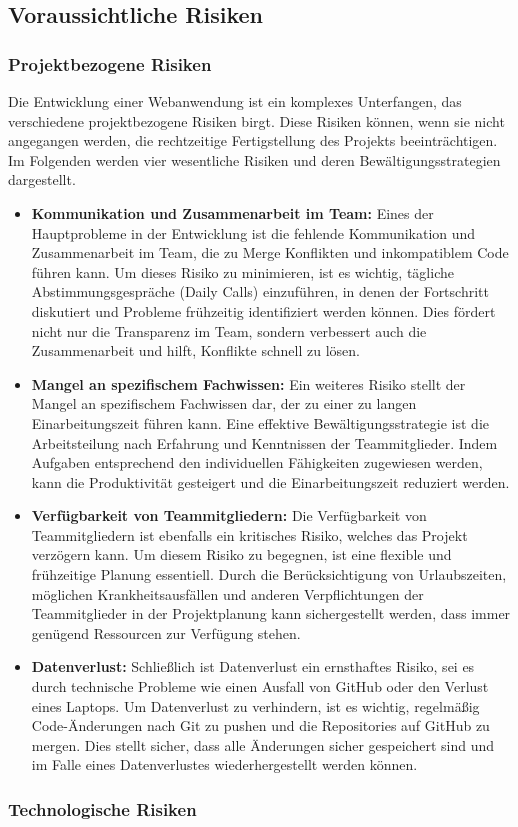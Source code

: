 \documentclass[../main.tex]{subfiles}
\begin{document}
\subsection{Voraussichtliche Risiken}

\subsubsection{Projektbezogene Risiken}

Die Entwicklung einer Webanwendung ist ein komplexes Unterfangen, das verschiedene projektbezogene Risiken birgt. Diese Risiken 
können, wenn sie nicht angegangen werden, die rechtzeitige Fertigstellung des Projekts beeinträchtigen. Im Folgenden werden vier 
wesentliche Risiken und deren Bewältigungsstrategien dargestellt.

\begin{itemize}

  \item \textbf{Kommunikation und Zusammenarbeit im Team:}
  Eines der Hauptprobleme in der Entwicklung ist die fehlende Kommunikation und Zusammenarbeit im Team, die zu Merge Konflikten und 
  inkompatiblem Code führen kann. Um dieses Risiko zu minimieren, ist es wichtig, tägliche Abstimmungsgespräche (Daily Calls) einzuführen, 
  in denen der Fortschritt diskutiert und Probleme frühzeitig identifiziert werden können. Dies fördert nicht nur die Transparenz im Team, 
  sondern verbessert auch die Zusammenarbeit und hilft, Konflikte schnell zu lösen.

  \item \textbf{Mangel an spezifischem Fachwissen:}
  Ein weiteres Risiko stellt der Mangel an spezifischem Fachwissen dar, der zu einer zu langen Einarbeitungszeit führen kann. Eine 
  effektive Bewältigungsstrategie ist die Arbeitsteilung nach Erfahrung und Kenntnissen der Teammitglieder. Indem Aufgaben entsprechend 
  den individuellen Fähigkeiten zugewiesen werden, kann die Produktivität gesteigert und die Einarbeitungszeit reduziert werden.

  \item \textbf{Verfügbarkeit von Teammitgliedern:}
  Die Verfügbarkeit von Teammitgliedern ist ebenfalls ein kritisches Risiko, welches das Projekt verzögern kann. Um diesem Risiko zu begegnen, 
  ist eine flexible und frühzeitige Planung essentiell. Durch die Berücksichtigung von Urlaubszeiten, möglichen Krankheitsausfällen und 
  anderen Verpflichtungen der Teammitglieder in der Projektplanung kann sichergestellt werden, dass immer genügend Ressourcen zur Verfügung 
  stehen.

  \item \textbf{Datenverlust:}
  Schließlich ist Datenverlust ein ernsthaftes Risiko, sei es durch technische Probleme wie einen Ausfall von GitHub oder den Verlust eines 
  Laptops. Um Datenverlust zu verhindern, ist es wichtig, regelmäßig Code-Änderungen nach Git zu pushen und die Repositories auf GitHub zu 
  mergen. Dies stellt sicher, dass alle Änderungen sicher gespeichert sind und im Falle eines Datenverlustes wiederhergestellt werden können.
  
\end{itemize}

\subsubsection{Technologische Risiken}
\end{document}
